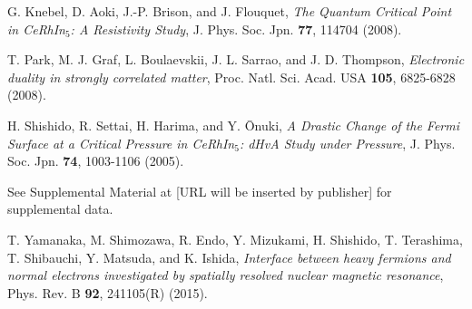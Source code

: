 \documentclass[twocolumn,preprintnumbers,amsmath,amssymb,prl]{revtex4}
\begin{document}
\begin{thebibliography}{99}
		G. Knebel, D. Aoki, J.-P. Brison, and J. Flouquet, 
		{\it The Quantum Critical Point in CeRhIn$_5$: A Resistivity Study}, 
		J. Phys. Soc. Jpn. {\bf 77}, 114704 (2008). 

		T. Park, M. J. Graf, L. Boulaevskii, J. L. Sarrao, and J. D. Thompson, 
		{\it Electronic duality in strongly correlated matter}, 
		Proc. Natl. Sci. Acad. USA {\bf 105}, 6825-6828 (2008). 
		
		H. Shishido, R. Settai, H. Harima, and Y. \={O}nuki, 
		{\it A Drastic Change of the Fermi Surface at a Critical Pressure in CeRhIn$_5$: dHvA Study under Pressure}, 
		J. Phys. Soc. Jpn. {\bf 74}, 1003-1106 (2005). 		
		
	See Supplemental Material at [URL will be inserted by publisher] for supplemental data. 
	
			

			
		
		T. Yamanaka, M. Shimozawa, R. Endo, Y. Mizukami, H. Shishido, T. Terashima, T. Shibauchi, Y. Matsuda, and K. Ishida,  
		{\it Interface between heavy fermions and normal electrons investigated by spatially resolved nuclear magnetic resonance}, 
		Phys. Rev. B {\bf 92}, 241105(R) (2015). 
				
			
		

\end{thebibliography}
\end{document}
